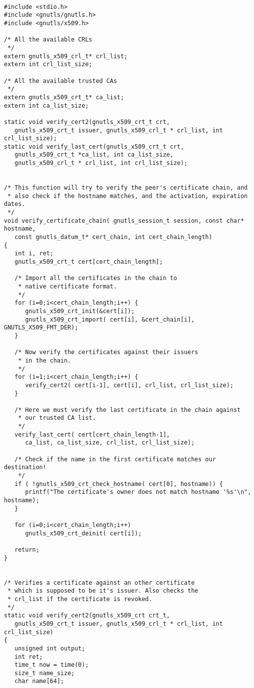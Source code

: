 \label{ex:verify-chain}

\begin{verbatim}

#include <stdio.h>
#include <gnutls/gnutls.h>
#include <gnutls/x509.h>

/* All the available CRLs
 */
extern gnutls_x509_crl_t* crl_list;
extern int crl_list_size;

/* All the available trusted CAs
 */
extern gnutls_x509_crt_t* ca_list;
extern int ca_list_size;

static void verify_cert2(gnutls_x509_crt_t crt,
   gnutls_x509_crt_t issuer, gnutls_x509_crl_t * crl_list, int crl_list_size);
static void verify_last_cert(gnutls_x509_crt_t crt,
   gnutls_x509_crt_t *ca_list, int ca_list_size,
   gnutls_x509_crl_t * crl_list, int crl_list_size);


/* This function will try to verify the peer's certificate chain, and
 * also check if the hostname matches, and the activation, expiration dates.
 */
void verify_certificate_chain( gnutls_session_t session, const char* hostname,
   const gnutls_datum_t* cert_chain, int cert_chain_length)
{
   int i, ret;
   gnutls_x509_crt_t cert[cert_chain_length];

   /* Import all the certificates in the chain to
    * native certificate format.
    */
   for (i=0;i<cert_chain_length;i++) {
      gnutls_x509_crt_init(&cert[i]);
      gnutls_x509_crt_import( cert[i], &cert_chain[i], GNUTLS_X509_FMT_DER);
   }

   /* Now verify the certificates against their issuers
    * in the chain.
    */   
   for (i=1;i<cert_chain_length;i++) {
      verify_cert2( cert[i-1], cert[i], crl_list, crl_list_size);
   }

   /* Here we must verify the last certificate in the chain against
    * our trusted CA list.
    */
   verify_last_cert( cert[cert_chain_length-1], 
      ca_list, ca_list_size, crl_list, crl_list_size);

   /* Check if the name in the first certificate matches our destination!
    */
   if ( !gnutls_x509_crt_check_hostname( cert[0], hostname)) {
      printf("The certificate's owner does not match hostname '%s'\n", hostname);
   }

   for (i=0;i<cert_chain_length;i++)
      gnutls_x509_crt_deinit( cert[i]);

   return;
}


/* Verifies a certificate against an other certificate
 * which is supposed to be it's issuer. Also checks the
 * crl_list if the certificate is revoked.
 */
static void verify_cert2(gnutls_x509_crt crt_t,
   gnutls_x509_crt_t issuer, gnutls_x509_crl_t * crl_list, int crl_list_size)
{ 
   unsigned int output;
   int ret;
   time_t now = time(0);
   size_t name_size;
   char name[64];


\end{verbatim}
